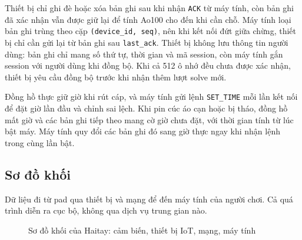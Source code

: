 Thiết bị chỉ ghi đè hoặc xóa bản ghi sau khi nhận \texttt{ACK} từ máy tính, còn bản ghi đã xác nhận vẫn được giữ lại để tính Ao100 cho đến khi cần chỗ. Máy tính loại bản ghi trùng theo cặp \texttt{(device\_id, seq)}, nên khi kết nối đứt giữa chừng, thiết bị chỉ cần gửi lại từ bản ghi sau \texttt{last\_ack}. Thiết bị không lưu thông tin người dùng: bản ghi chỉ mang số thứ tự, thời gian và mã session, còn máy tính gắn session với người dùng khi đồng bộ. Khi cả 512 ô nhớ đều chưa được xác nhận, thiết bị yêu cầu đồng bộ trước khi nhận thêm lượt solve mới.

Đồng hồ thực giữ giờ khi rút cáp, và máy tính gửi lệnh \texttt{SET\_TIME} mỗi lần kết nối để đặt giờ lần đầu và chỉnh sai lệch. Khi pin cúc áo cạn hoặc bị tháo, đồng hồ mất giờ và các bản ghi tiếp theo mang cờ giờ chưa đặt, với thời gian tính từ lúc bật máy. Máy tính quy đổi các bản ghi đó sang giờ thực ngay khi nhận lệnh trong cùng lần bật.

\subsection{Sơ đồ khối}
Dữ liệu đi từ pad qua thiết bị và mạng để đến máy tính của người chơi. Cả quá trình diễn ra cục bộ, không qua dịch vụ trung gian nào.

\begin{figure}[H]
    \centering
    \caption{Sơ đồ khối của Haitay: cảm biến, thiết bị IoT, mạng, máy tính}
    \label{fig:block}
\end{figure}
